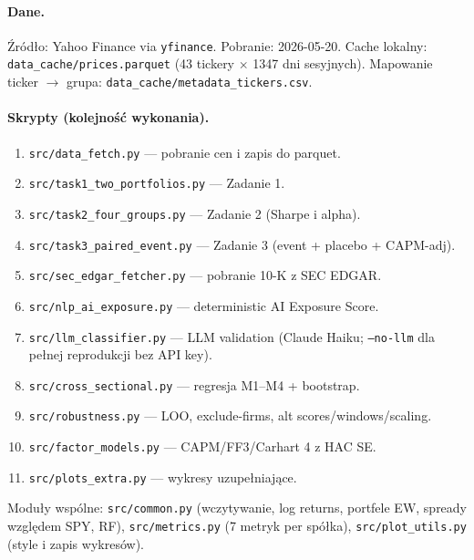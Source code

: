 \documentclass[11pt,a4paper]{article}
\begin{document}
\paragraph{Dane.} Źródło: Yahoo Finance via \texttt{yfinance}. Pobranie:
2026-05-20. Cache lokalny: \texttt{data\_cache/prices.parquet}
(43 tickery $\times$ 1347 dni sesyjnych). Mapowanie ticker $\rightarrow$ grupa:
\texttt{data\_cache/metadata\_tickers.csv}.

\paragraph{Skrypty (kolejność wykonania).}
\begin{enumerate}
  \item \texttt{src/data\_fetch.py} --- pobranie cen i zapis do parquet.
  \item \texttt{src/task1\_two\_portfolios.py} --- Zadanie 1.
  \item \texttt{src/task2\_four\_groups.py} --- Zadanie 2 (Sharpe i alpha).
  \item \texttt{src/task3\_paired\_event.py} --- Zadanie 3 (event + placebo + CAPM-adj).
  \item \texttt{src/sec\_edgar\_fetcher.py} --- pobranie 10-K z SEC EDGAR.
  \item \texttt{src/nlp\_ai\_exposure.py} --- deterministic AI Exposure Score.
  \item \texttt{src/llm\_classifier.py} --- LLM validation (Claude Haiku;
        \texttt{--no-llm} dla pełnej reprodukcji bez API key).
  \item \texttt{src/cross\_sectional.py} --- regresja M1--M4 + bootstrap.
  \item \texttt{src/robustness.py} --- LOO, exclude-firms, alt scores/windows/scaling.
  \item \texttt{src/factor\_models.py} --- CAPM/FF3/Carhart 4 z HAC SE.
  \item \texttt{src/plots\_extra.py} --- wykresy uzupełniające.
\end{enumerate}
Moduły wspólne: \texttt{src/common.py} (wczytywanie, log returns, portfele EW,
spready względem SPY, RF), \texttt{src/metrics.py} (7 metryk per spółka),
\texttt{src/plot\_utils.py} (style i zapis wykresów).
\end{document}
